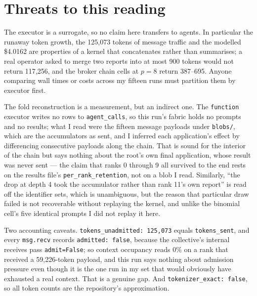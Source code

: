 \documentclass[11pt]{article}
\begin{document}
\section{Threats to this reading}

The executor is a surrogate, so no claim here transfers to agents. In particular the
runaway token growth, the 125{,}073 tokens of message traffic and the modelled \$4.0162 are
properties of a kernel that concatenates rather than summarises; a real operator asked to
merge two reports into at most 900 tokens would not return 117{,}256, and the broker chain
cells at $p=8$ return 387--695. Anyone comparing wall times or costs across my fifteen runs
must partition them by executor first.

The fold reconstruction is a measurement, but an indirect one. The \texttt{function}
executor writes no rows to \texttt{agent\_calls}, so this run's fabric holds no prompts and
no results; what I read were the fifteen message payloads under \texttt{blobs/}, which are
the accumulators as sent, and I inferred each application's effect by differencing
consecutive payloads along the chain. That is sound for the interior of the chain but says
nothing about the root's own final application, whose result was never sent --- the claim
that ranks 0 through 9 all survived to the end rests on the results file's
\texttt{per\_rank\_retention}, not on a blob I read. Similarly, ``the drop at depth 4 took
the accumulator rather than rank 11's own report'' is read off the identifier sets, which
is unambiguous, but the reason that particular draw failed is not recoverable without
replaying the kernel, and unlike the binomial cell's five identical prompts I did not
replay it here.

Two accounting caveats. \texttt{tokens\_unadmitted: 125{,}073} equals
\texttt{tokens\_sent}, and every \texttt{msg.recv} records \texttt{admitted: false}, because
the collective's internal receives pass \texttt{admit=False}; so context occupancy reads 0\%
on a rank that received a 59{,}226-token payload, and this run says nothing about admission
pressure even though it is the one run in my set that would obviously have exhausted a real
context. That is a genuine gap. And \texttt{tokenizer\_exact: false}, so all token counts are
the repository's approximation.
\end{document}
